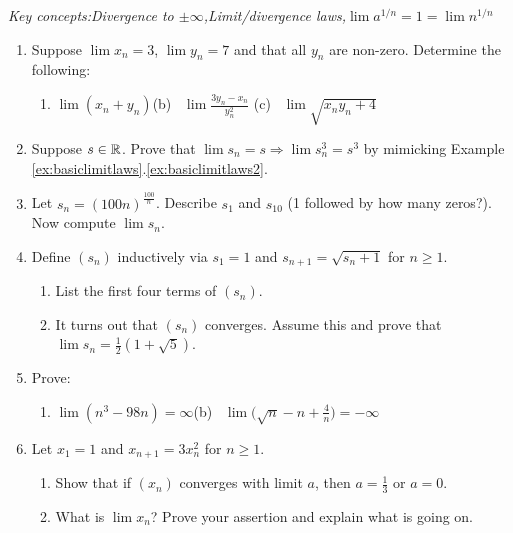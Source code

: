 \begin{exercises}{}{}
	\emph{Key concepts:\quad Divergence to $\pm\infty$,\qquad Limit/divergence laws,\qquad $\lim a^{1/n}=1=\lim n^{1/n}$}
 
	\begin{enumerate}
		\item%
		Suppose $\lim x_n=3$, $\lim y_n=7$ and that all $y_n$ are non-zero. Determine the following:
	  \begin{enumerate}
	    \item $\lim(x_n+y_n)$\qquad (b) \ $\lim\frac{3y_n-x_n}{y_n^2}$ \qquad (c) \ $\lim \sqrt{x_ny_n+4}$
	  \end{enumerate}
	  
	  		
		
 		\item Suppose $s\in\mathbb{R}$. Prove that $\lim s_n=s\Longrightarrow \lim s_n^3=s^3$ by mimicking Example \ref*{ex:basiclimitlaws}.\ref{ex:basiclimitlaws2}. %
	  
	  
	  \item Let $s_n=(100n)^{\frac{100}n}$. Describe $s_1$ and $s_{10}$ (1 followed by how many zeros?). Now compute $\lim s_n$.
	  
	  
	  \item%
	  Define $(s_n)$ inductively via $s_1=1$ and $s_{n+1}=\sqrt{s_n+1}$ for $n\ge 1$.
	  \begin{enumerate}
		  \item List the first four terms of $(s_n)$.
		  \item It turns out that $(s_n)$ converges. Assume this and prove that $\lim s_n=\frac 12(1+\sqrt 5)$.
	  \end{enumerate}
	  
	  
	  \item Prove:
	  \begin{enumerate}
	    \item $\lim(n^3-98n)=\infty$\qquad\qquad (b) \ $\lim \bigl(\sqrt n-n+\frac 4n\bigr)=-\infty$
	  \end{enumerate}
	  
	  
	  \item%
	  Let $x_1=1$ and $x_{n+1}=3x_n^2$ for $n\ge 1$.
	  \begin{enumerate}
		  \item Show that if $(x_n)$ converges with limit $a$, then $a=\frac 13$ or $a=0$.
		  \item What is $\lim x_n$? Prove your assertion and explain what is going on.
	  \end{enumerate}
	  

\end{enumerate}
\end{exercises}
